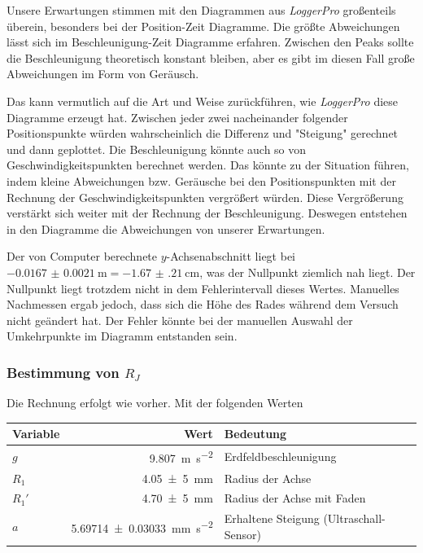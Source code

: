         Unsere Erwartungen stimmen mit den Diagrammen aus \textit{LoggerPro} großenteils überein, besonders bei der Position-Zeit Diagramme. Die größte Abweichungen lässt sich im Beschleunigung-Zeit Diagramme erfahren. Zwischen den Peaks sollte die Beschleunigung theoretisch konstant bleiben, aber es gibt im diesen Fall große Abweichungen im Form von Geräusch. 

        Das kann vermutlich auf die Art und Weise zurückführen, wie \textit{LoggerPro} diese Diagramme erzeugt hat. Zwischen jeder zwei nacheinander folgender Positionspunkte würden wahrscheinlich die Differenz und "Steigung" gerechnet und dann geplottet. Die Beschleunigung könnte auch so von Geschwindigkeitspunkten berechnet werden. Das könnte zu der Situation führen, indem kleine Abweichungen bzw. Geräusche bei den Positionspunkten mit der Rechnung der Geschwindigkeitspunkten vergrößert würden. Diese Vergrößerung verstärkt sich weiter mit der Rechnung der Beschleunigung. Deswegen entstehen in den Diagramme die Abweichungen von unserer Erwartungen.

        Der von Computer berechnete $y$-Achsenabschnitt liegt bei $\SI{-0.0167(21)}{\meter} = \SI{-1.67(21)}{\centi\meter}$, was der Nullpunkt ziemlich nah liegt. Der Nullpunkt liegt trotzdem nicht in dem Fehlerintervall dieses Wertes. Manuelles Nachmessen ergab jedoch, dass sich die Höhe des Rades während dem Versuch nicht geändert hat. Der Fehler könnte bei der manuellen Auswahl der Umkehrpunkte im Diagramm entstanden sein. 

        \subsubsection{Bestimmung von $R_J$}
            Die Rechnung erfolgt wie vorher. Mit der folgenden Werten
            \begin{center}
                \begin{tabular}{lrl}
                    \toprule
                    Variable & Wert & Bedeutung \\
                    \midrule
                    $g$ & \SI{9.807}{\meter\per\second\squared} & Erdfeldbeschleunigung \\
                    $R_1$ & \SI{4,05(5)}{\milli\meter} & Radius der Achse \\
                    $R_1'$ & \SI{4,70(5)}{\milli\meter} & Radius der Achse mit Faden \\
                    $a$ & \SI{5.69714(3033)}{\milli\meter\per\second\squared} & Erhaltene Steigung (Ultraschall-Sensor) \\ %
                    \bottomrule
                \end{tabular}
            \end{center}

